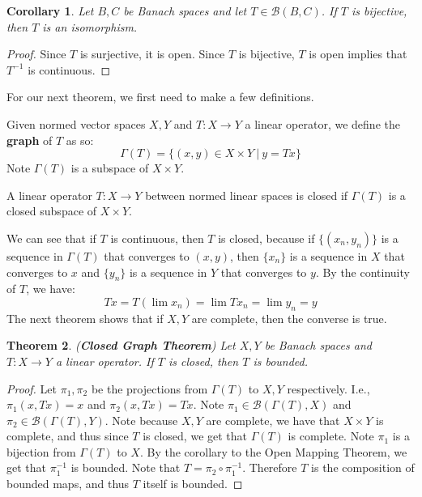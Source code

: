 \documentclass[a4paper,12pt]{report}
\newcommand{\ms}[1]{\mathscr{#1}}
\newtheorem{theorem}{Theorem}[section]
\newtheorem{corollary}[theorem]{Corollary}
\newenvironment{definition}[1][Definition.]{\begin{trivlist}
\item[\hskip \labelsep {\bfseries #1}]}{\end{trivlist}}
\begin{document}
	\begin{corollary}
	Let $B, C$ be Banach spaces and let $T \in \ms{B}(B, C)$. If $T$ is bijective, then $T$ is an isomorphism.
	\end{corollary}
	\begin{proof}
	Since $T$ is surjective, it is open. Since $T$ is bijective, $T$ is open implies that $T^{-1}$ is continuous.
	\end{proof}
	
	\noindent For our next theorem, we first need to make a few definitions.
	
	\begin{definition}
	Given normed vector spaces $X, Y$ and $T : X \rightarrow Y$ a linear operator, we define the \textbf{graph} of $T$ as so:
	\[ \Gamma(T) = \{(x, y) \in X \times Y ~|~ y = Tx \} \]
	Note $\Gamma(T)$ is a subspace of $X \times Y$.
	\end{definition}
	
	\begin{definition}
	A linear operator $T : X \rightarrow Y$ between normed linear spaces is closed if $\Gamma(T)$ is a closed subspace of $X \times Y$. 
	\end{definition}
	
	\noindent We can see that if $T$ is continuous, then $T$ is closed, because if $\{(x_n, y_n)\}$ is a sequence in $\Gamma(T)$ that converges to $(x, y)$, then $\{x_n\}$ is a sequence in $X$ that converges to $x$ and $\{y_n\}$ is a sequence in $Y$ that converges to $y$. By the continuity of $T$, we have:
	\[ Tx = T\left(\lim x_n \right) = \lim Tx_n = \lim y_n = y \]
	The next theorem shows that if $X, Y$ are complete, then the converse is true.
	
	\begin{theorem}
	\emph{(\textbf{Closed Graph Theorem})}
	Let $X, Y$ be Banach spaces and $T : X \rightarrow Y$ a linear operator. If $T$ is closed, then $T$ is bounded.
	\end{theorem}
	\begin{proof}
	Let $\pi_1, \pi_2$ be the projections from $\Gamma(T)$ to $X, Y$ respectively. I.e., $\pi_1(x, Tx) = x$ and $\pi_2(x, Tx) = Tx$. Note $\pi_1 \in \ms{B}(\Gamma(T), X)$ and $\pi_2 \in \ms{B}(\Gamma(T), Y)$. Note because $X, Y$ are complete, we have that $X \times Y$ is complete, and thus since $T$ is closed, we get that $\Gamma(T)$ is complete. Note $\pi_1$ is a bijection from $\Gamma(T)$ to $X$. By the corollary to the Open Mapping Theorem, we get that $\pi_1^{-1}$ is bounded. Note that $T = \pi_2 \circ \pi_1^{-1}$. Therefore $T$ is the composition of bounded maps, and thus $T$ itself is bounded. 
	\end{proof}
	
\end{document}
